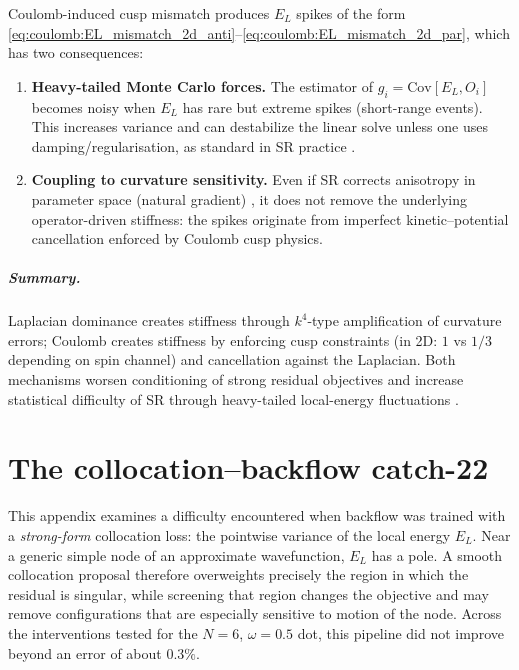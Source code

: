Coulomb-induced cusp mismatch produces $E_L$ spikes of the form
\eqref{eq:coulomb:EL_mismatch_2d_anti}--\eqref{eq:coulomb:EL_mismatch_2d_par},
which has two consequences:
\begin{enumerate}
\item \textbf{Heavy-tailed Monte Carlo forces.}
The estimator of $g_i=\mathrm{Cov}[E_L,O_i]$ becomes noisy when $E_L$ has rare but
extreme spikes (short-range events). This increases variance and can destabilize
the linear solve unless one uses damping/regularisation, as standard in SR practice
\cite{BeccaSorella2017-QMCBook}.
\item \textbf{Coupling to curvature sensitivity.}
Even if SR corrects anisotropy in parameter space (natural gradient)
\cite{Amari1998-NaturalGradient,ParkKastoryano2020-GeometryNQS}, it does not remove
the underlying operator-driven stiffness: the spikes originate from imperfect
kinetic--potential cancellation enforced by Coulomb cusp physics.
\end{enumerate}

\paragraph{Summary.}
Laplacian dominance creates stiffness through $k^4$-type amplification of curvature
errors; Coulomb creates stiffness by enforcing cusp constraints (in 2D: $1$ vs $1/3$
depending on spin channel) and cancellation against the Laplacian.
Both mechanisms worsen conditioning of strong residual objectives and increase
statistical difficulty of SR through heavy-tailed local-energy fluctuations
\cite{De_Ryck_2024,BeccaSorella2017-QMCBook,Siljamaki2003-QD-Cusps}.

\chapter{The collocation--backflow catch-22}
\label{app:catch22}

This appendix examines a difficulty encountered when backflow was trained with a
\emph{strong-form} collocation loss: the pointwise variance of the local energy $E_L$.
Near a generic simple node of an approximate wavefunction, $E_L$ has a pole. A smooth
collocation proposal therefore overweights precisely the region in which the residual is
singular, while screening that region changes the objective and may remove configurations
that are especially sensitive to motion of the node. Across the interventions tested for
the $N{=}6$, $\omega{=}0.5$ dot, this pipeline did not improve beyond an error of about
$0.3\%$.

